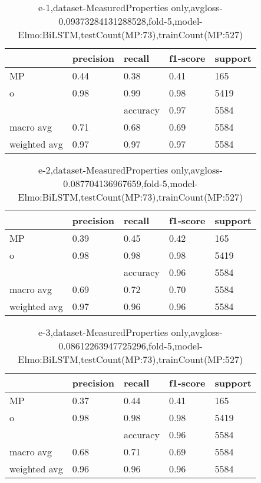 \begin{table}[!ht] 
\centering
\caption{e-1,dataset-MeasuredProperties only,avgloss-0.09373284131288528,fold-5,model-Elmo:BiLSTM,testCount(MP:73),trainCount(MP:527)}\label{e-1data-mpS.tsv}
\begin{tabularx}{300pt}{|X|X|X|X|X|}
\hline
&precision&recall&f1-score&support\\
\hline
MP&0.44&0.38&0.41&165\\
\hline
o&0.98&0.99&0.98&5419\\
\hline
&&accuracy&0.97&5584\\
\hline
macro avg&0.71&0.68&0.69&5584\\
\hline
weighted avg&0.97&0.97&0.97&5584\\
\hline
\end{tabularx}
\end{table}
\begin{table}[!ht] 
\centering
\caption{e-2,dataset-MeasuredProperties only,avgloss-0.087704136967659,fold-5,model-Elmo:BiLSTM,testCount(MP:73),trainCount(MP:527)}\label{e-2data-mpS.tsv}
\begin{tabularx}{300pt}{|X|X|X|X|X|}
\hline
&precision&recall&f1-score&support\\
\hline
MP&0.39&0.45&0.42&165\\
\hline
o&0.98&0.98&0.98&5419\\
\hline
&&accuracy&0.96&5584\\
\hline
macro avg&0.69&0.72&0.70&5584\\
\hline
weighted avg&0.97&0.96&0.96&5584\\
\hline
\end{tabularx}
\end{table}
\begin{table}[!ht] 
\centering
\caption{e-3,dataset-MeasuredProperties only,avgloss-0.08612263947725296,fold-5,model-Elmo:BiLSTM,testCount(MP:73),trainCount(MP:527)}\label{e-3data-mpS.tsv}
\begin{tabularx}{300pt}{|X|X|X|X|X|}
\hline
&precision&recall&f1-score&support\\
\hline
MP&0.37&0.44&0.41&165\\
\hline
o&0.98&0.98&0.98&5419\\
\hline
&&accuracy&0.96&5584\\
\hline
macro avg&0.68&0.71&0.69&5584\\
\hline
weighted avg&0.96&0.96&0.96&5584\\
\hline
\end{tabularx}
\end{table}
